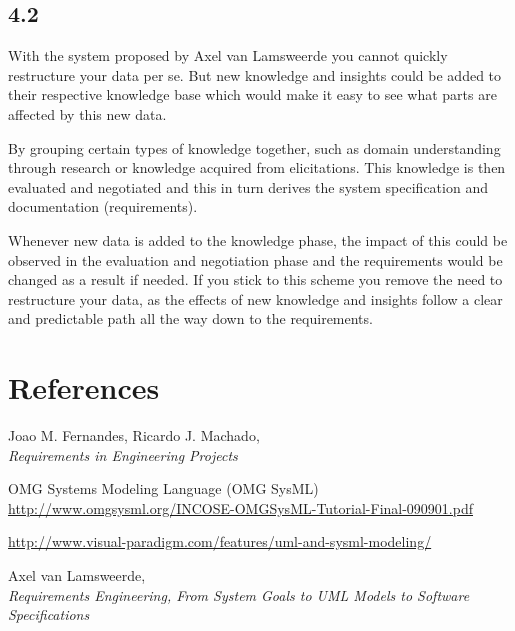 \section*{4.2}
With the system proposed by Axel van Lamsweerde \cite{lamsweerde} you cannot quickly restructure your data per se. But new knowledge and insights could be added to their respective knowledge base which would make it easy to see what parts are affected by this new data.

By grouping certain types of knowledge together, such as domain understanding through research or knowledge acquired from elicitations. This knowledge is then evaluated and negotiated and this in turn derives the system specification and documentation (requirements).

Whenever new data is added to the knowledge phase, the impact of this could be observed in the evaluation and negotiation phase and the requirements would be changed as a result if needed. If you stick to this scheme you remove the need to restructure your data, as the effects of new knowledge and insights follow a clear and predictable path all the way down to the requirements.

\chapter{References}

\begin{thebibliography}{9}
	
	Joao M. Fernandes, Ricardo J. Machado, \\
	\emph{Requirements in Engineering Projects}
	
	OMG Systems Modeling Language (OMG SysML) \\
	\url{http://www.omgsysml.org/INCOSE-OMGSysML-Tutorial-Final-090901.pdf}
	
	\url{http://www.visual-paradigm.com/features/uml-and-sysml-modeling/}
	
	Axel van Lamsweerde, \\
	\emph{Requirements Engineering, From System Goals to UML Models to Software Specifications}
	
\end{thebibliography}


\appendix



